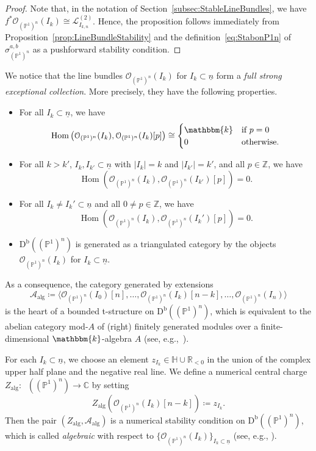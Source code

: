 \documentclass[11pt, reqno]{amsart}
\numberwithin{equation}{section}
\theoremstyle{plain}
\theoremstyle{remark}
\theoremstyle{definition}
\theoremstyle{italicsname}
\newcommand{\Db}{\mathrm{D^b}}
\newcommand{\num}{\mathrm{num}}
\DeclareMathOperator{\Knum}{\rK_{\num}}
\DeclareMathOperator{\Hom}{Hom}
\newcommand{\cO}{\mathcal{O}}
\newcommand{\cL}{\mathcal{L}}
\newcommand{\cA}{\mathscr{A}}
\newcommand{\rK}{\mathrm{K}}
\newcommand{\KK}{\mathbbm{k}}
\def\CC{\ensuremath{\mathbb{C}}}
\def\RR{\ensuremath{\mathbb{R}}}
\def\ZZ{\ensuremath{\mathbb{Z}}}
\def\PP{\ensuremath{\mathbb{P}}}
\begin{document}
\begin{proof}
Note that, in the notation of Section~\ref{subsec:StableLineBundles},  we have $f^*\cO_{(\PP^1)^n}(I_{k})\cong\cL_{I_{k,n}}^{(2)}$. 
Hence, the proposition follows immediately from Proposition~\ref{prop:LineBundleStability} and the definition~\eqref{eq:StabonP1n} of $\sigma^{a,b}_{(\PP^1)^n}$ as a pushforward stability condition.
\end{proof}

We notice that the line bundles $\cO_{(\PP^1)^n}(I_{k})$ for $I_k \subset \underline{n}$ form a \emph{full strong exceptional collection}. More precisely, they have the following properties.
\begin{itemize}
\item For all $I_{k}\subset\underline{n}$, we have
\[
\Hom\left(\cO_{(\PP^1)^n}(I_{k}),\cO_{(\PP^1)^n}(I_{k})[p]\right)\cong\begin{cases}\KK&\text{if }p=0\\0&\text{otherwise.}\end{cases}
\]
\item For all $k>k'$,  $I_{k},I_{k'}\subset\underline{n}$ with $|I_{k}| = k$ and $|I_{k'}| = k'$, and all $p\in\ZZ$, we have
\[
\Hom\left(\cO_{(\PP^1)^n}(I_{k}),\cO_{(\PP^1)^n}(I_{k'})[p]\right)=0.
\]
\item For all $I_{k}\neq I_{k}'\subset\underline{n}$ and all $0 \neq p\in\ZZ$, we have
\[
\Hom\left(\cO_{(\PP^1)^n}(I_{k}),\cO_{(\PP^1)^n}(I_{k}')[p]\right)=0.
\]
\item $\Db((\PP^1)^n)$ is generated as a triangulated category by the objects $\cO_{(\PP^1)^n}(I_{k})$ for $I_k \subset \underline{n}$.
\end{itemize}

As a consequence, the category generated by extensions
\[
\cA_\mathrm{alg}\coloneqq\langle\cO_{(\PP^1)^n}(I_{0})[n],\dots,\cO_{(\PP^1)^n}(I_{k})[n-k],\dots,\cO_{(\PP^1)^n}(I_{n})\rangle
\]
is the heart of a bounded t-structure on $\Db((\PP^1)^n)$, which is equivalent to the abelian category mod-$A$ of (right) finitely generated modules over a finite-dimensional $\KK$-algebra $A$ (see, e.g.,~\cite[Theorem 6.2]{Bondal}).

For each $I_k \subset \underline{n}$, we choose an element $z_{I_k} \in \mathbb{H}\cup\RR_{<0}$ in the union of the complex upper half plane and the negative real line.
We define a numerical central charge $Z_{\mathrm{alg}} \colon \Knum((\PP^1)^n) \to \CC$ by setting
\[
Z_\mathrm{alg}\left(\cO_{(\PP^1)^n}(I_{k})[n-k]\right)\coloneqq z_{I_k}.
\]
Then the pair $(Z_\mathrm{alg},\cA_\mathrm{alg})$ is a numerical stability condition on $\Db((\PP^1)^n)$, which is called \emph{algebraic} with respect to $\{\cO_{(\PP^1)^n}(I_{k})\}_{I_k\subset\underline{n}}$ (see, e.g., \cite[Section 3.3]{macricurves}).
\end{document}

